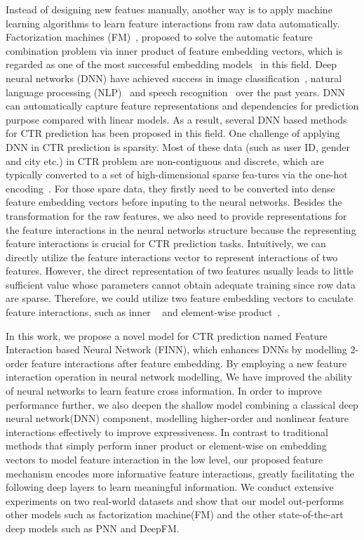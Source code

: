 \documentclass[journal]{IEEEtran}
\begin{document}
Instead of designing new featues manually,  another way is to apply machine learning algorithms to learn feature interactions from raw data automatically. Factorization machines (FM)~\cite{13}, proposed to solve the automatic feature combination problem via inner product of  feature embedding vectors, which is regarded as one of the most successful embedding models~\cite{22} in this field. Deep neural networks (DNN) have achieved success in image classification~\cite{50,18,27}, natural language processing (NLP)~\cite{51,19} and speech recognition~\cite{20} over the past years. DNN can automatically capture feature representations and dependencies for prediction purpose compared with linear models. As a result, several DNN based methods for CTR prediction has been proposed in this field. One challenge of applying DNN in CTR prediction is sparsity. Most of these data (such as user ID, gender and city etc.) in CTR problem are non-contiguous and discrete, which are typically converted to a set of high-dimensional sparse fea-tures via the one-hot encoding~\cite{3,4,5,6,7}. For those spare data, they firstly need to be converted into dense feature embedding vectors before inputing to the neural networks. Besides the transformation for the raw features, we also need to provide representations for the feature interactions in the neural networks structure because the representing feature interactions is crucial for CTR prediction tasks. Intuitively, we can directly utilize the feature interactions vector to represent interactions of two features. However, the direct representation of two features usually leads to little sufficient value whose parameters cannot obtain adequate training since row data are sparse. Therefore, we could utilize two feature embedding vectors to caculate feature interactions, such as inner ~\cite{13,29} and element-wise product~\cite{21,32}.

In this work, we propose a novel model for CTR prediction named Feature Interaction based Neural Network (FINN), which enhances DNNs by modelling 2-order feature interactions after feature embedding. By employing a new feature interaction operation in neural network modelling, We have improved the ability of neural networks to learn feature cross information. In order to improve performance further, we also deepen the shallow model combining a classical deep neural network(DNN) component, modelling higher-order and nonlinear feature interactions effectively to improve expressiveness. In contrast to traditional methods that simply perform inner product or element-wise on embedding vectors to model feature interaction in the low level, our proposed feature  mechanism encodes more informative feature interactions, greatly facilitating the following deep layers to learn meaningful information. We conduct extensive experiments on two real-world datasets and show that our model out-performs other models such as factorization machine(FM) and the other state-of-the-art deep models such as PNN and DeepFM.
\end{document}

